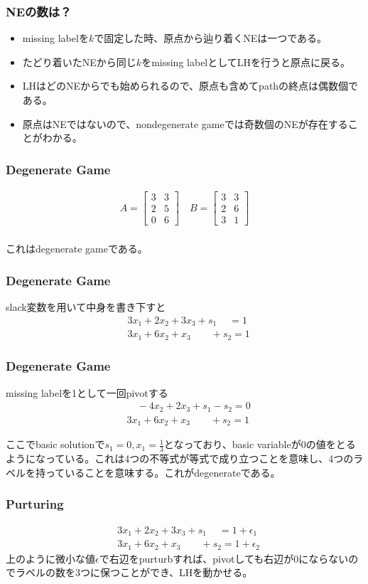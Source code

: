 \documentclass[dvipdfmx, 12pt]{beamer}
\begin{document}
\begin{frame}\frametitle{NEの数は？}
\begin{itemize}
	\item missing labelを$k$で固定した時、原点から辿り着くNEは一つである。
	\item たどり着いたNEから同じ$k$をmissing labelとしてLHを行うと原点に戻る。
	\item LHはどのNEからでも始められるので、原点も含めてpathの終点は偶数個である。
	\item 原点はNEではないので、nondegenerate gameでは奇数個のNEが存在することがわかる。
\end{itemize}
\end{frame}

\begin{frame}\frametitle{Degenerate Game}
\begin{align*}
	A = 
	\begin{bmatrix} 
	3 & 3\\
	2 & 5 \\
	0 & 6
	\end{bmatrix}\quad
	B = 
	\begin{bmatrix}
	3 & 3\\
	2 & 6\\
	3 & 1
	\end{bmatrix}\\
\end{align*}

これはdegenerate gameである。
\end{frame}

\begin{frame}\frametitle{Degenerate Game}
slack変数を用いて中身を書き下すと
\begin{align*}
	&3x_1 + 2x_2 + 3x_3 + s_1\quad \ = 1\\
	&3x_1 + 6x_2 + x_3 \quad \quad + s_2 = 1
\end{align*}
\end{frame}

\begin{frame}\frametitle{Degenerate Game}
missing labelを1として一回pivotする
\begin{align*}
	&\quad  -4x_2 + 2x_3 + s_1 - s_2 = 0\\
	&3x_1 + 6x_2 + x_3 \qquad+ s_2 = 1
\end{align*}

ここでbasic solutionで$s_1 = 0, x_1 = \frac{1}{3}$となっており、basic variableが0の値をとるようになっている。これは4つの不等式が等式で成り立つことを意味し、4つのラベルを持っていることを意味する。これがdegenerateである。
\end{frame}

\begin{frame}\frametitle{Purturing}
	\begin{align*}
	&3x_1 + 2x_2 + 3x_3 + s_1\quad \ = 1 + \epsilon_1\\
	&3x_1 + 6x_2 + x_3 \quad \quad + s_2 = 1 + \epsilon_2
	\end{align*}
	上のように微小な値$\epsilon$で右辺をpurturbすれば、pivotしても右辺が0にならないのでラベルの数を3つに保つことができ、LHを動かせる。
\end{frame}
\end{document}
